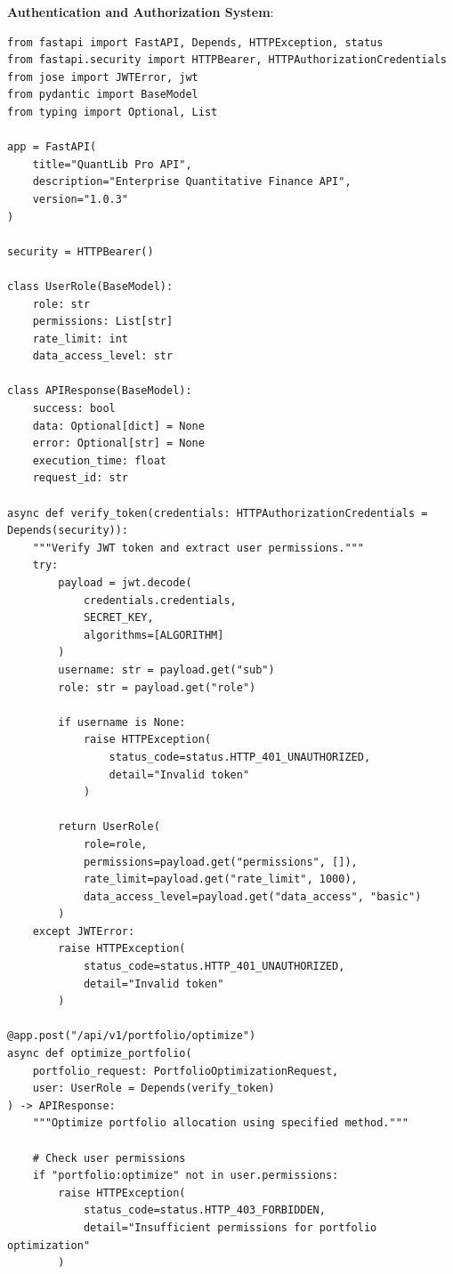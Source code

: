 \documentclass[12pt,a4paper]{article}
\theoremstyle{definition}
\theoremstyle{remark}
\begin{document}
\textbf{Authentication and Authorization System}:
\begin{lstlisting}[caption=API Security Implementation]
from fastapi import FastAPI, Depends, HTTPException, status
from fastapi.security import HTTPBearer, HTTPAuthorizationCredentials
from jose import JWTError, jwt
from pydantic import BaseModel
from typing import Optional, List

app = FastAPI(
    title="QuantLib Pro API",
    description="Enterprise Quantitative Finance API",
    version="1.0.3"
)

security = HTTPBearer()

class UserRole(BaseModel):
    role: str
    permissions: List[str]
    rate_limit: int
    data_access_level: str

class APIResponse(BaseModel):
    success: bool
    data: Optional[dict] = None
    error: Optional[str] = None
    execution_time: float
    request_id: str

async def verify_token(credentials: HTTPAuthorizationCredentials = Depends(security)):
    """Verify JWT token and extract user permissions."""
    try:
        payload = jwt.decode(
            credentials.credentials, 
            SECRET_KEY, 
            algorithms=[ALGORITHM]
        )
        username: str = payload.get("sub")
        role: str = payload.get("role")
        
        if username is None:
            raise HTTPException(
                status_code=status.HTTP_401_UNAUTHORIZED,
                detail="Invalid token"
            )
            
        return UserRole(
            role=role,
            permissions=payload.get("permissions", []),
            rate_limit=payload.get("rate_limit", 1000),
            data_access_level=payload.get("data_access", "basic")
        )
    except JWTError:
        raise HTTPException(
            status_code=status.HTTP_401_UNAUTHORIZED,
            detail="Invalid token"
        )

@app.post("/api/v1/portfolio/optimize")
async def optimize_portfolio(
    portfolio_request: PortfolioOptimizationRequest,
    user: UserRole = Depends(verify_token)
) -> APIResponse:
    """Optimize portfolio allocation using specified method."""
    
    # Check user permissions
    if "portfolio:optimize" not in user.permissions:
        raise HTTPException(
            status_code=status.HTTP_403_FORBIDDEN,
            detail="Insufficient permissions for portfolio optimization"
        )
    

\end{lstlisting}
\end{document}
